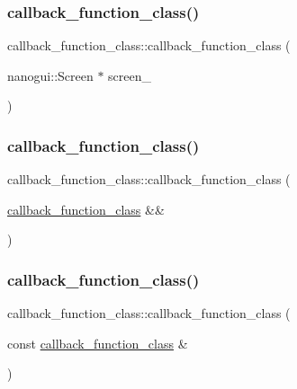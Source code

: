 \subsubsection{\texorpdfstring{callback\+\_\+function\+\_\+class()}{callback\_function\_class()}\hspace{0.1cm}{\footnotesize\ttfamily [4/6]}}
{\footnotesize\ttfamily callback\+\_\+function\+\_\+class\+::callback\+\_\+function\+\_\+class (\begin{DoxyParamCaption}\item[{nanogui\+::\+Screen $\ast$}]{screen\+\_\+ }\end{DoxyParamCaption})\hspace{0.3cm}{\ttfamily [inline]}}

\mbox{\label{classcallback__function__class_a1fae5711b34c371261d280afb9085756}} 
\subsubsection{\texorpdfstring{callback\+\_\+function\+\_\+class()}{callback\_function\_class()}\hspace{0.1cm}{\footnotesize\ttfamily [5/6]}}
{\footnotesize\ttfamily callback\+\_\+function\+\_\+class\+::callback\+\_\+function\+\_\+class (\begin{DoxyParamCaption}\item[{\mbox{\hyperlink{classcallback__function__class}{callback\+\_\+function\+\_\+class}} \&\&}]{ }\end{DoxyParamCaption})\hspace{0.3cm}{\ttfamily [delete]}}

\mbox{\label{classcallback__function__class_a966edfa3807e811f7e9b9c1ee2185b3e}} 
\subsubsection{\texorpdfstring{callback\+\_\+function\+\_\+class()}{callback\_function\_class()}\hspace{0.1cm}{\footnotesize\ttfamily [6/6]}}
{\footnotesize\ttfamily callback\+\_\+function\+\_\+class\+::callback\+\_\+function\+\_\+class (\begin{DoxyParamCaption}\item[{const \mbox{\hyperlink{classcallback__function__class}{callback\+\_\+function\+\_\+class}} \&}]{ }\end{DoxyParamCaption})\hspace{0.3cm}{\ttfamily [delete]}}



